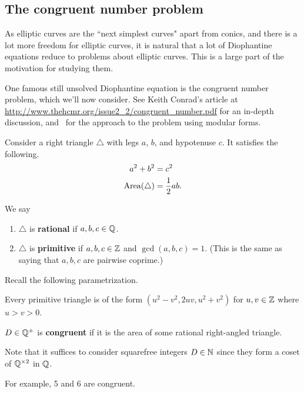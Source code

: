\subsection{The congruent number problem}
As elliptic curves are the ``next simplest curves" apart from conics, and there is a lot more freedom for elliptic curves, it is natural that a lot of Diophantine equations reduce to problems about elliptic curves. This is a large part of the motivation for studying them.

One famous still unsolved Diophantine equation is the congruent number problem, which we'll now consider. See Keith Conrad's article at \url{http://www.thehcmr.org/issue2_2/congruent_number.pdf} for an in-depth discussion, and~\cite{Ko84} for the approach to the problem using modular forms.

Consider a right triangle $\triangle$ with legs $a$, $b$, and hypotenuse $c$. It satisfies the following.
\begin{align*}
a^2+b^2&=c^2\\
\operatorname{Area}(\triangle)&=\frac{1}{2}ab.
\end{align*}
\begin{df}
We say
\begin{enumerate}
\item
$\triangle$ is \textbf{rational} if $a,b,c\in \mathbb{Q}$. 
\item
$\triangle$ is \textbf{primitive} if $a,b,c\in \mathbb{Z}$ and $\gcd(a,b,c)=1$. (This is the same as saying that $a,b,c$ are pairwise coprime.)
\end{enumerate}
\end{df}
Recall the following parametrization.
\begin{lem}
Every primitive triangle is of the form $(u^2-v^2,2uv,u^2+v^2)$ for $u,v\in \mathbb{Z}$ where $u>v>0$.
\end{lem}
\begin{df}
$D\in \mathbb{Q}^+$ is \textbf{congruent} if it is the area of some rational right-angled triangle.
\end{df}
Note that it suffices to consider squarefree integers $D\in \mathbb{N}$ since they form a coset of $\mathbb{Q}^{\times 2}$ in $\mathbb{Q}$.

For example, 5 and 6 are congruent.

